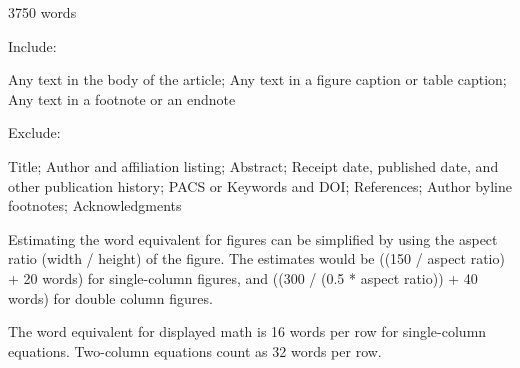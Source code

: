 \documentclass[%
 reprint,
superscriptaddress,
showpacs,preprintnumbers,
 amsmath,amssymb,
 aps,
 prl,
]{revtex4-1}
\begin{document}
3750 words

Include:

Any text in the body of the article;
Any text in a figure caption or table caption;
Any text in a footnote or an endnote

Exclude:

Title;
Author and affiliation listing;
Abstract;
Receipt date, published date, and other publication history;
PACS or Keywords and DOI;\@
References;
Author byline footnotes;
Acknowledgments

Estimating the word equivalent for figures can be simplified by using the aspect
ratio (width / height) of the figure. The estimates would be ((150 / aspect
ratio) + 20 words) for single-column figures, and ((300 / (0.5 * aspect ratio))
+ 40 words) for double column figures.

The word equivalent for displayed math is 16 words per row for single-column
equations. Two-column equations count as 32 words per row.




\end{document}

